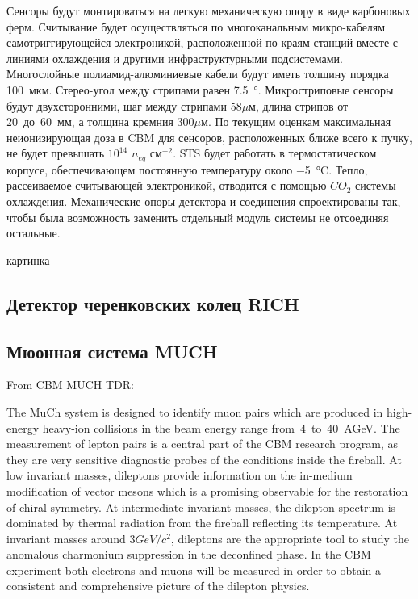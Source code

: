 Сенсоры будут монтироваться на легкую механическую опору в виде карбоновых ферм. Считывание будет осуществляться по многоканальным микро-кабелям самотриггирующейся электроникой, расположенной по краям станций вместе с линиями охлаждения и другими инфраструктурными подсистемами.
Многослойные полиамид-алюминиевые кабели будут иметь толщину порядка 100~мкм.
Стерео-угол между стрипами равен \SI{7.5}{\degree}.
Микростриповые сенсоры будут двухсторонними, шаг между стрипами $58 \mu$м, длина стрипов от 20~до~60~мм, а толщина кремния $300 \mu$м. По текущим оценкам максимальная неионизирующая доза в CBM для сенсоров, расположенных ближе всего к пучку, не будет превышать $10^{14}$ $n_{eq}$ см$^{-2}$. STS будет работать в термостатическом корпусе, обеспечивающем постоянную температуру около \SI{-5}{\degreeCelsius}. Тепло, рассеиваемое считывающей электроникой, отводится с помощью $CO_{2}$ системы охлаждения. Механические опоры детектора и соединения спроектированы так, чтобы была возможность заменить отдельный модуль системы не отсоединяя остальные.

\todo картинка

\subsection{Детектор черенковских колец RICH}\label{sec:secRICH}

\subsection{Мюонная система MUCH}\label{sec:secMUCH}

From CBM MUCH TDR:

The MuCh system is designed to identify muon pairs which are produced in high-energy heavy-ion collisions in the beam energy range from~4~to~40~AGeV. The measurement of lepton pairs is a central part of the CBM research program, as they are very sensitive diagnostic probes of the conditions inside the fireball. At low invariant masses, dileptons provide information on the in-medium modification of vector mesons which is a promising observable for the restoration of chiral symmetry. At intermediate invariant masses, the dilepton spectrum is dominated by thermal radiation from the fireball reflecting its temperature. At invariant masses around $ 3 GeV/c^{2} $, dileptons are the appropriate tool to study the anomalous charmonium suppression in the deconfined phase. In the CBM experiment both electrons and muons will be measured in order to obtain a consistent and comprehensive picture of the dilepton physics.

